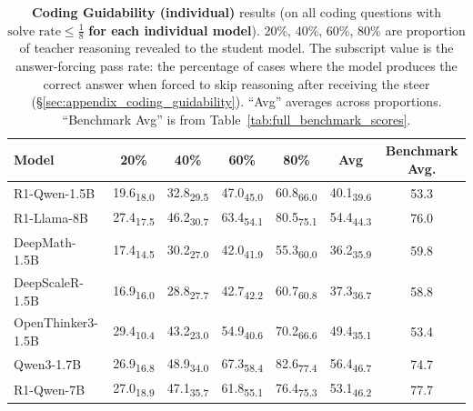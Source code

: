 \documentclass{article} %
\begin{document}
\begin{table}[ht!]
  \centering
  \begin{tabular}{lccccc|c}
    \toprule
    \textbf{Model} & \textbf{20\%} & \textbf{40\%} & \textbf{60\%} & \textbf{80\%} & \textbf{Avg} & \textbf{Benchmark Avg.} \\
    \midrule
    R1-Qwen-1.5B       & 19.6\textsubscript{18.0} & 32.8\textsubscript{29.5} & 47.0\textsubscript{45.0} & 60.8\textsubscript{66.0} & 40.1\textsubscript{39.6} & 53.3 \\
    R1-Llama-8B         & 27.4\textsubscript{17.5} & 46.2\textsubscript{30.7} & 63.4\textsubscript{54.1} & 80.5\textsubscript{75.1} & 54.4\textsubscript{44.3} & 76.0 \\
    DeepMath-1.5B       & 17.4\textsubscript{14.5} & 30.2\textsubscript{27.0} & 42.0\textsubscript{41.9} & 55.3\textsubscript{60.0} & 36.2\textsubscript{35.9} & 59.8 \\
    DeepScaleR-1.5B     & 16.9\textsubscript{16.0} & 28.8\textsubscript{27.7} & 42.7\textsubscript{42.2} & 60.7\textsubscript{60.8} & 37.3\textsubscript{36.7} & 58.8 \\
    OpenThinker3-1.5B   & 29.4\textsubscript{10.4} & 43.2\textsubscript{23.0} & 54.9\textsubscript{40.6} & 70.2\textsubscript{66.6} & 49.4\textsubscript{35.1} & 53.4 \\
    Qwen3-1.7B          & 26.9\textsubscript{16.8} & 48.9\textsubscript{34.0} & 67.3\textsubscript{58.4} & 82.6\textsubscript{77.4} & 56.4\textsubscript{46.7} & 74.7 \\
    R1-Qwen-7B          & 27.0\textsubscript{18.9} & 47.1\textsubscript{35.7} & 61.8\textsubscript{55.1} & 76.4\textsubscript{75.3} & 53.1\textsubscript{46.2} & 77.7 \\
    \bottomrule
  \end{tabular}
  \caption{\textbf{Coding Guidability (individual)} results (on all coding questions with $\text{solve rate} \leq \frac{1}{8}$ \textbf{for each individual model}). 20\%, 40\%, 60\%, 80\% are proportion of teacher reasoning revealed to the student model. The subscript value is the answer-forcing pass rate: the percentage of cases where the model produces the correct answer when forced to skip reasoning after receiving the steer (\S\ref{sec:appendix_coding_guidability}). ``Avg'' averages across proportions. ``Benchmark Avg'' is from Table~\ref{tab:full_benchmark_scores}.}
  \label{tab:coding_guidability_all}
\end{table}

\newpage
\end{document}
